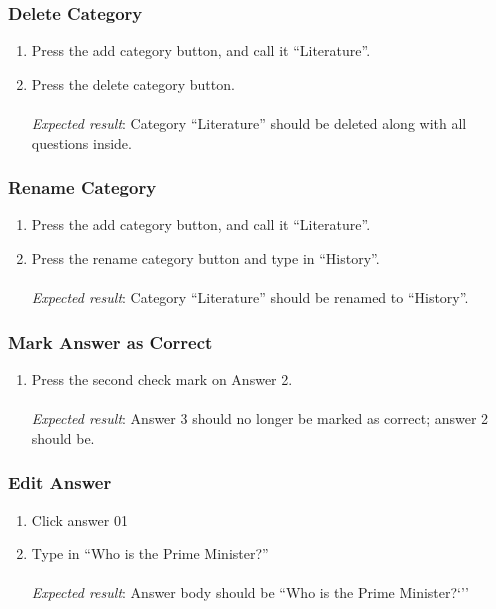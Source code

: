 \subsubsection{Delete Category}
\begin{enumerate}[leftmargin=*]
\item Press the add category button, and call it ``Literature''.
\item Press the delete category button.\\\\
\textit{Expected result}: Category ``Literature'' should be deleted along with all questions inside.
\end{enumerate}

\subsubsection{Rename Category}
\begin{enumerate}[leftmargin=*]
\item Press the add category button, and call it ``Literature''.
\item Press the rename category button and type in ``History''.\\\\
\textit{Expected result}: Category ``Literature'' should be renamed to ``History''.
\end{enumerate}

\subsubsection{Mark Answer as Correct}
\begin{enumerate}[leftmargin=*]
\item Press the second check mark on Answer 2.\\\\
\textit{Expected result}: Answer 3 should no longer be marked as correct; answer 2 should be.
\end{enumerate}

\subsubsection{Edit Answer}
\begin{enumerate}[leftmargin=*]
\item Click answer 01
\item Type in ``Who is the Prime Minister?''\\\\
\textit{Expected result}: Answer body should be ``Who is the Prime Minister?`''
\end{enumerate}

